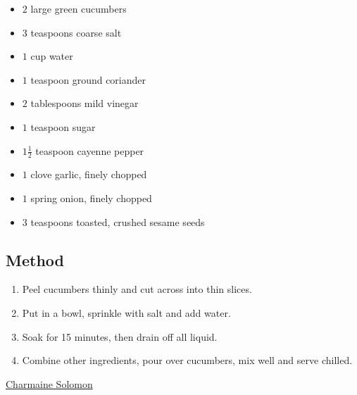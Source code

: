\documentclass[11pt,a4paper]{article}
\begin{document}
\begin{itemize}
  \item $ 2 $ large green cucumbers
  \item $ 3 $ teaspoons coarse salt
  \item $ 1 $ cup water
  \item $ 1 $ teaspoon ground coriander
  \item $ 2 $ tablespoons mild vinegar
  \item $ 1 $ teaspoon sugar
  \item $ 1 \frac{1}{2} $ teaspoon cayenne pepper
  \item $ 1 $ clove garlic, finely chopped
  \item $ 1 $ spring onion, finely chopped
  \item $ 3 $ teaspoons toasted, crushed sesame seeds
\end{itemize}

\medskip

\subsection*{Method}

\begin{enumerate}
  \item Peel cucumbers thinly and cut across into thin slices.
  \item Put in a bowl, sprinkle with salt and add water.
  \item Soak for 15 minutes, then drain off all liquid. 
  \item Combine other ingredients, pour over cucumbers, mix well and serve chilled. 
\end{enumerate}

\href{https://www.charmainesolomon.com/}{Charmaine Solomon}
\end{document}
